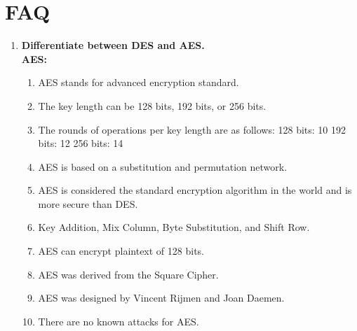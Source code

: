 \documentclass[11pt]{article}
\begin{document}
\section{FAQ}

\begin{enumerate}
	\item \textbf{Differentiate between DES and AES.}\\
	\textbf{AES: }
	\begin{enumerate}
		\item AES stands for advanced encryption standard.                                                   
		\item The key length can be 128 bits, 192 bits, or 256 bits.                                         
		\item The rounds of operations per key length are as follows: 128 bits: 10 192 bits: 12 256 bits: 14 
		\item AES is based on a substitution and permutation network.                                        
		\item AES is considered the standard encryption algorithm in the world and is more secure than DES.  
		\item Key Addition, Mix Column, Byte Substitution, and Shift Row.                                    
		\item AES can encrypt plaintext of 128 bits.                                                         
		\item AES was derived from the Square Cipher.                                                        
		\item AES was designed by Vincent Rijmen and Joan Daemen.                                            
		\item There are no known attacks for AES.                                                            
	\end{enumerate}
	

\end{enumerate}
\end{document}
